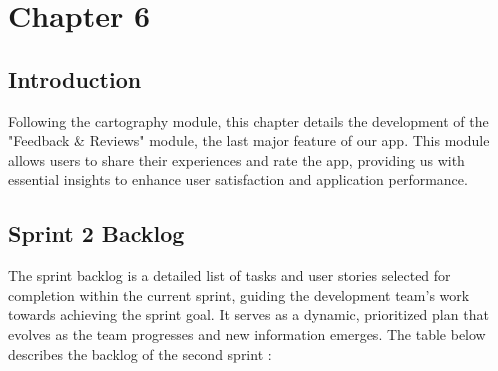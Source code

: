 
\chapter*{Chapter 6}


\setcounter{chapter}{6}
\setcounter{section}{0}
\setcounter{table}{0} 
\setcounter{figure}{0} 


\vspace{0.25cm}

\setcounter{tocdepth}{1}
\headrule


\localtableofcontents
\newpage

\section*{Introduction}
Following the cartography module, this chapter details the development of the "Feedback \& Reviews" module, the last major feature of our app. This module allows users to share their experiences and rate the app, providing us with essential insights to enhance user satisfaction and application performance.

\section{Sprint 2 Backlog}

The sprint backlog is a detailed list of tasks and user stories selected for completion within the current sprint, guiding the development team's work towards achieving the sprint goal. It serves as a dynamic, prioritized plan that evolves as the team progresses and new information emerges.
The table below describes the backlog of the second sprint :




